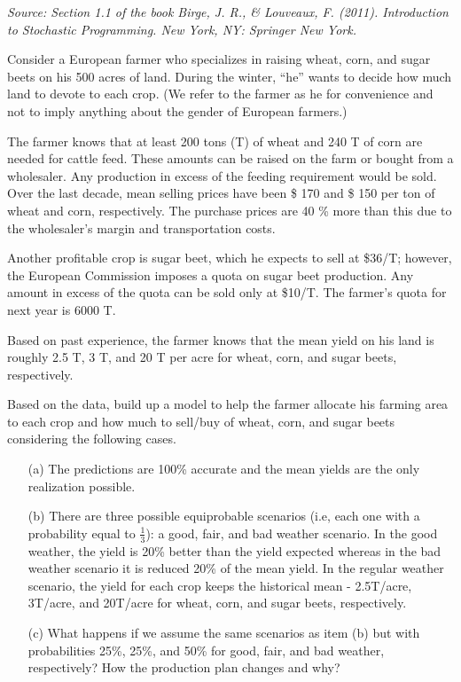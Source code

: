 \textit{
	Source: Section 1.1 of the book Birge, J. R., \& Louveaux, F. (2011). Introduction to Stochastic Programming. New York, NY: Springer New York.
}


Consider a European farmer who specializes in raising wheat, corn, and sugar beets on his 500 acres of land. During the winter, ``he'' wants to decide how much land to devote to each crop. (We refer to the farmer as he for convenience and not to imply anything about the gender of European farmers.)

The farmer knows that at least 200 tons (T) of wheat and 240 T of corn are needed for cattle feed. These amounts can be raised on the farm or bought from a wholesaler. Any production in excess of the feeding requirement would be sold. Over the last decade, mean selling prices have been \$ 170 and \$ 150 per ton of wheat and corn, respectively. The purchase prices are 40 \% more than this due to the wholesaler's margin and transportation costs.

Another profitable crop is sugar beet, which he expects to sell at \$36/T; however, the European Commission imposes a quota on sugar beet production. Any amount in excess of the quota can be sold only at \$10/T. The farmer’s quota for next year is 6000 T.

Based on past experience, the farmer knows that the mean yield on his land is
roughly 2.5 T, 3 T, and 20 T per acre for wheat, corn, and sugar beets, respectively.

Based on the data, build up a model to help the farmer allocate his farming area to each crop and how much to sell/buy of wheat, corn, and sugar beets considering the following cases.

\begin{itemize}
	\item[(a)] The predictions are 100\% accurate and the mean yields are the only realization possible.	
	\item[(b)] There are three possible equiprobable scenarios (i.e, each one with a probability equal to $\frac{1}{3}$): a good, fair, and bad weather scenario. In the good weather, the yield is 20\% better than the yield expected whereas in the bad weather scenario it is reduced 20\% of the mean yield. In the regular weather scenario, the yield for each crop keeps the historical mean - 2.5T/acre, 3T/acre, and 20T/acre for wheat, corn, and sugar beets, respectively.
	\item[(c)]	What happens if we assume the same scenarios as item (b) but with probabilities 25\%, 25\%, and 50\% for good, fair, and bad weather, respectively? How the production plan changes and why?	
\end{itemize}
